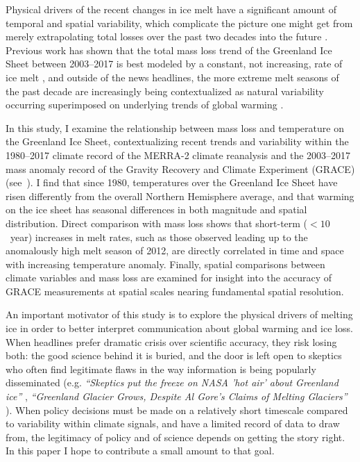 \documentclass[11pt]{report}
\begin{document}
Physical drivers of the recent changes in ice melt have a significant amount of temporal and spatial variability, which complicate the picture one might get from merely extrapolating total losses over the past two decades into the future \cite[][]{enderlin2014,mcmillan2016,mattingly2018,hahn2018,bevis2019}. Previous work has shown that the total mass loss trend of the Greenland Ice Sheet between 2003--2017 is best modeled by a constant, not increasing, rate of ice melt \cite[][]{getraerFall}, and outside of the news headlines, the more extreme melt seasons of the past decade are increasingly being contextualized as natural variability occurring superimposed on underlying trends of global warming \cite[][]{hahn2018,bevis2019}. 

In this study, I examine the relationship between mass loss and temperature on the Greenland Ice Sheet, contextualizing recent trends and variability within the 1980--2017 climate record of the MERRA-2 climate reanalysis and the 2003--2017 mass anomaly record of the Gravity Recovery and Climate Experiment (GRACE) (see~). I find that since 1980, temperatures over the Greenland Ice Sheet have risen differently from the overall Northern Hemisphere average, and that warming on the ice sheet has seasonal differences in both magnitude and spatial distribution. Direct comparison with mass loss shows that short-term ($<10$~year) increases in melt rates, such as those observed leading up to the anomalously high melt season of 2012, are directly correlated in time and space with increasing temperature anomaly. Finally, spatial comparisons between climate variables and mass loss are examined for insight into the accuracy of GRACE measurements at spatial scales nearing fundamental spatial resolution.

An important motivator of this study is to explore the physical drivers of melting ice in order to better interpret communication about global warming and ice loss. When headlines prefer dramatic crisis over scientific accuracy, they risk losing both: the good science behind it is buried, and the door is left open to skeptics who often find legitimate flaws in the way information is being popularly disseminated (e.g. \textit{``Skeptics put the freeze on NASA 'hot air' about Greenland ice''} \cite[][]{fox}, \textit{``Greenland Glacier Grows, Despite Al Gore's Claims of Melting Glaciers''} \cite[][]{mrc}). When policy decisions must be made on a relatively short timescale compared to variability within climate signals, and have a limited record of data to draw from, the legitimacy of policy and of science depends on getting the story right. In this paper I hope to contribute a small amount to that goal.
\end{document}
